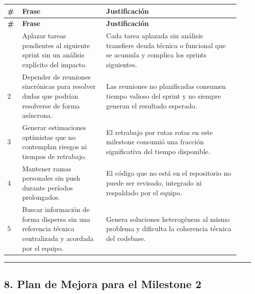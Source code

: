 \documentclass[11pt,a4paper]{article}
\begin{document}
\begingroup
\scriptsize
\setlength{\tabcolsep}{3pt}
\begin{longtable}{P{0.06\linewidth}P{0.34\linewidth}P{0.54\linewidth}}
\toprule
\textbf{\#} & \textbf{Frase} & \textbf{Justificación} \\
\midrule
\endfirsthead
\toprule
\textbf{\#} & \textbf{Frase} & \textbf{Justificación} \\
\midrule
\endhead
\bottomrule
{} & Aplazar tareas pendientes al siguiente sprint sin un análisis explícito del impacto. & Cada tarea aplazada sin análisis transfiere deuda técnica o funcional que se acumula y complica los sprints siguientes. \\
2 & Depender de reuniones sincrónicas para resolver dudas que podrían resolverse de forma asíncrona. & Las reuniones no planificadas consumen tiempo valioso del sprint y no siempre generan el resultado esperado. \\
3 & Generar estimaciones optimistas que no contemplan riesgos ni tiempos de retrabajo. & El retrabajo por rutas rotas en este milestone consumió una fracción significativa del tiempo disponible. \\
4 & Mantener ramas personales sin push durante períodos prolongados. & El código que no está en el repositorio no puede ser revisado, integrado ni respaldado por el equipo. \\
5 & Buscar información de forma dispersa sin una referencia técnica centralizada y acordada por el equipo. & Genera soluciones heterogéneas al mismo problema y dificulta la coherencia técnica del codebase. \\
\end{longtable}
\endgroup

\vspace{0.6em}\hrule\vspace{0.8em}

\subsection{8. Plan de Mejora para el Milestone 2}
\end{document}
